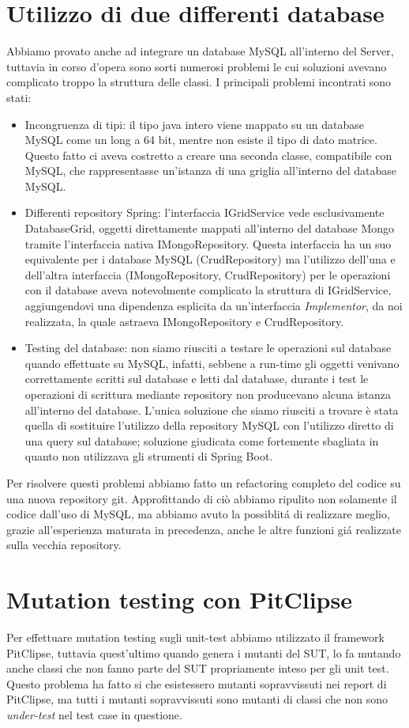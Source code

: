 \section{Utilizzo di due differenti database}
Abbiamo provato anche ad integrare un database MySQL all'interno del Server, tuttavia in corso d'opera sono sorti numerosi problemi le cui soluzioni avevano complicato troppo la struttura delle classi. I principali problemi incontrati sono stati:
\begin{itemize}
	\item Incongruenza di tipi: il tipo java intero viene mappato su un database MySQL come un long a 64 bit, mentre non esiste il tipo di dato matrice. Questo fatto ci aveva costretto a creare una seconda classe, compatibile con MySQL, che rappresentasse un'istanza di una griglia all'interno del database MySQL. 
	\item Differenti repository Spring: l'interfaccia IGridService vede esclusivamente DatabaseGrid, oggetti direttamente mappati all'interno del database Mongo tramite l'interfaccia nativa IMongoRepository. Questa interfaccia ha un suo equivalente per i database MySQL (CrudRepository) ma l'utilizzo dell'una e dell'altra interfaccia (IMongoRepository, CrudRepository) per le operazioni con il database aveva notevolmente complicato la struttura di IGridService, aggiungendovi una dipendenza esplicita da un'interfaccia \emph{Implementor}, da noi realizzata, la quale astraeva IMongoRepository e CrudRepository. 
	\item Testing del database: non siamo riusciti a testare le operazioni sul database quando effettuate su MySQL, infatti, sebbene a run-time gli oggetti venivano correttamente scritti sul database e letti dal database, durante i test le operazioni di scrittura mediante repository non producevano alcuna istanza all'interno del database. L'unica soluzione che siamo riusciti a trovare \`e stata quella di sostituire l'utilizzo della repository MySQL con l'utilizzo diretto di una query sul database; soluzione giudicata come fortemente sbagliata in quanto non utilizzava gli strumenti di Spring Boot.
\end{itemize} 
Per risolvere questi problemi abbiamo fatto un refactoring completo del codice su una nuova repository git. Approfittando di ci\`o abbiamo ripulito non solamente il codice dall'uso di MySQL, ma abbiamo avuto la possiblit\'a di realizzare meglio, grazie all'esperienza maturata in precedenza, anche le altre funzioni gi\'a realizzate sulla vecchia repository.
\section{Mutation testing con PitClipse}
Per effettuare mutation testing sugli unit-test abbiamo utilizzato il framework PitClipse, tuttavia quest'ultimo quando genera i mutanti del SUT, lo fa mutando anche classi che non fanno parte del SUT propriamente inteso per gli unit test. Questo problema ha fatto si che esistessero mutanti sopravvissuti nei report di PitClipse, ma tutti i mutanti sopravvissuti sono mutanti di classi che non sono \emph{under-test} nel test case in questione.
